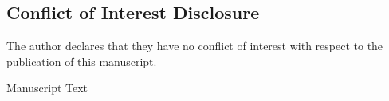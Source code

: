 \documentclass[12pt,english]{article}
\begin{document}
\subsection*{Conflict of Interest Disclosure}
The author declares that they have no conflict of interest with respect to the publication of this manuscript.

\clearpage 


\setcounter{page}{1}
\renewcommand*{\thefootnote}{\arabic{footnote}}
\doublespacing
\begingroup
  \centering
  \Large Manuscript Text\\[1em]
\endgroup


\newpage
\begingroup
{}
\setlength\bibitemsep{5.0pt}
\printbibliography[title=References for Manuscript]
\endgroup
\pagebreak



\appendix
\begin{refsection}

\setcounter{page}{1}
\end{refsection}
\end{document}
